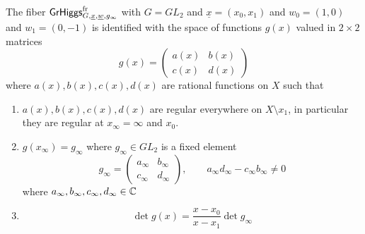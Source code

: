 \documentclass[12pt,psamsfonts,reqno]{amsart}
\begin{document}
 \begin{proposition} The fiber $\mathsf{GrHiggs}^{\mathrm{fr}}_{G,\underline{x}, \underline{w}, g_\infty}$
   with $G = GL_2$ and $\underline{x} = (x_0, x_1)$ and $w_0 = (1,0)$ and $w_{1} = (0,-1)$ is identified with the space of functions $g(x)$
   valued in $2 \times 2$ matrices
   \begin{equation}
     g(x) =
     \begin{pmatrix}
       a(x) & b(x) \\
       c(x) & d(x)
     \end{pmatrix}
   \end{equation}
   where $a(x), b(x), c(x), d(x)$ are rational functions on $X$ such that 
   \begin{enumerate}
   \item $a(x), b(x), c(x), d(x)$ are regular everywhere on $X \setminus {x_1}$,
     in particular they are regular at $x_\infty = \infty$ and $x_0$.
   \item $g(x_\infty) = g_\infty$ where $g_\infty \in GL_2$ is a fixed element
     \begin{equation}
       g_\infty =
       \begin{pmatrix}
         a_\infty & b_\infty \\
         c_\infty & d_\infty 
       \end{pmatrix}, \qquad a_\infty d_\infty - c_\infty b_\infty \neq 0 
     \end{equation}
where $a_\infty, b_\infty, c_\infty, d_\infty \in \mathbb C$ 
   \item
     \begin{equation}
       \det g(x) =  \frac{ x- x_0}{ x - x_1}  \det g_\infty
     \end{equation}
   \end{enumerate}
 

\end{proposition}
\end{document}
